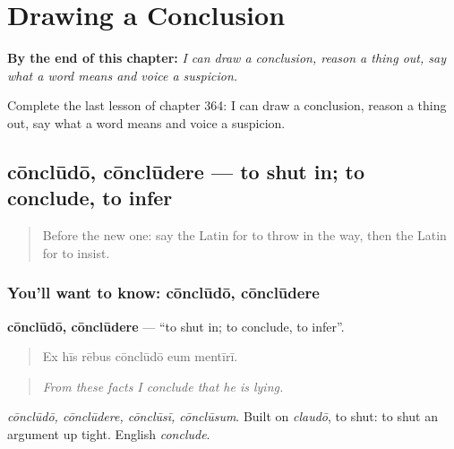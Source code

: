 
\chapter{Drawing a Conclusion}
\label{ch:la-drawing-a-conclusion}

\begin{chapteropening}
\textbf{By the end of this chapter:} \emph{I can draw a conclusion, reason a thing out, say what a word means and voice a suspicion.}

Complete the last lesson of chapter 364: I can draw a conclusion, reason a thing out, say what a word means and voice a suspicion.
\end{chapteropening}

\section[cōnclūdō, cōnclūdere]{cōnclūdō, cōnclūdere — to shut in; to conclude, to infer}

\label{lesson:LA-C364-concludo}



\begin{quote}
Before the new one: say the Latin for to throw in the way, then the Latin for to insist.
\end{quote}

\subsection*{You'll want to know: cōnclūdō, cōnclūdere}
\textbf{cōnclūdō, cōnclūdere} — \textquotedblleft{}to shut in; to conclude, to infer\textquotedblright{}.

\begin{quote}
Ex hīs rēbus cōnclūdō eum mentīrī.
\end{quote}

\begin{quote}
\emph{From these facts I conclude that he is lying.}
\end{quote}

\emph{cōnclūdō, cōnclūdere, cōnclūsī, cōnclūsum}. Built on \emph{claudō}, to shut: to shut an argument up tight. English \emph{conclude}.

